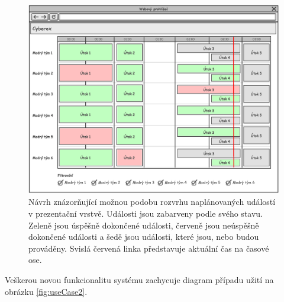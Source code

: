 \documentclass[
  digital,
  twoside,
  table, 
  nolof, 
  nolot
]{fithesis3}
\begin{document}
\begin{figure}
    \centering
    \includegraphics[width=13cm]{images/Web-Wireframe1.eps}
    \caption{Návrh znázorňující možnou podobu rozvrhu naplánovaných událostí v prezentační vrstvě. Události jsou zabarveny podle svého stavu. Zeleně jsou úspěšně dokončené události, červeně jsou neúspěšně dokončené události a šedě jsou události, které jsou, nebo budou prováděny. Svislá červená linka představuje aktuální čas na časové ose.}
    \label{fig:wireframeTimetable}
\end{figure}

Veškerou novou funkcionalitu systému zachycuje diagram případu užití na obrázku \ref{fig:useCase2}.
\end{document}
